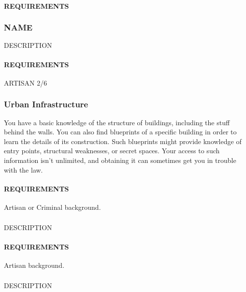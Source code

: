     \paragraph{REQUIREMENTS}

    \subsubsection{NAME} \label{feat::NAME}
    DESCRIPTION
    \paragraph{REQUIREMENTS}

ARTISAN 2/6
    \subsubsection{Urban Infrastructure} \label{feat::urbaninfrastructure}
    You have a basic knowledge of the structure of buildings, including the stuff behind the walls.
    You can also find blueprints of a specific building in order to learn the details of its construction.
    Such blueprints might provide knowledge of entry points, structural weaknesses, or secret spaces.
    Your access to such information isn't unlimited, and obtaining it can sometimes get you in trouble with the law.
    \paragraph{REQUIREMENTS} Artisan or Criminal background.

    \subsubsection{} \label{feat::NAME}
    DESCRIPTION
    \paragraph{REQUIREMENTS} Artisan background.

    \subsubsection{} \label{feat::NAME}
    DESCRIPTION
